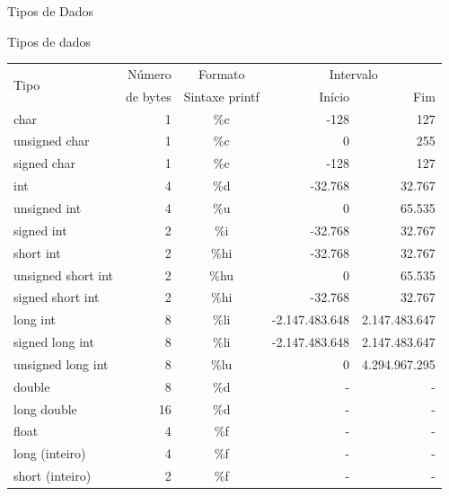 \begin{frame}{Tipos de Dados}
    \fontsize{14pt}{15.2}\par
    
    \vspace{1em}

\end{frame}



\begin{frame}{Tipos de dados}
	\vspace{1em}


\begin{tabular}{|l|r|c|r|r|}
\hline
\multirow{2}{*}{Tipo} & Número & 
Formato  & \multicolumn{2}{c|}{Intervalo}\\ 

& de bytes & Sintaxe printf & 
Início & Fim \\ \hline 

char& 1& \%c & -128 & 127 \\ \hline
unsigned char & 1& \%c & 0& 255 \\ \hline
signed char & 1& \%c & -128 & 127 \\ \hline
int & 4 & \%d & -32.768& 32.767\\ \hline
unsigned int& 4 & \%u & 0& 65.535\\ \hline
signed int& 2 & \%i & -32.768& 32.767\\ \hline
short int & 2 & \%hi& -32.768& 32.767\\ \hline
unsigned short int& 2 & \%hu& 0& 65.535\\ \hline
signed short int& 2 & \%hi& -32.768& 32.767\\ \hline
long int& 8 & \%li& -2.147.483.648 & 2.147.483.647 \\ \hline
signed long int & 8 & \%li& -2.147.483.648 & 2.147.483.647 \\ \hline
unsigned long int & 8 & \%lu& 0& 4.294.967.295 \\ \hline
double & 8 & \%d& - & - \\ \hline
long double & 16 & \%d& - & - \\ \hline
float & 4 & \%f & - & - \\ \hline
long (inteiro) & 4 & \%f & - & - \\ \hline
short (inteiro) & 2 & \%f & - & - \\ \hline
\end{tabular}

	
\end{frame}


